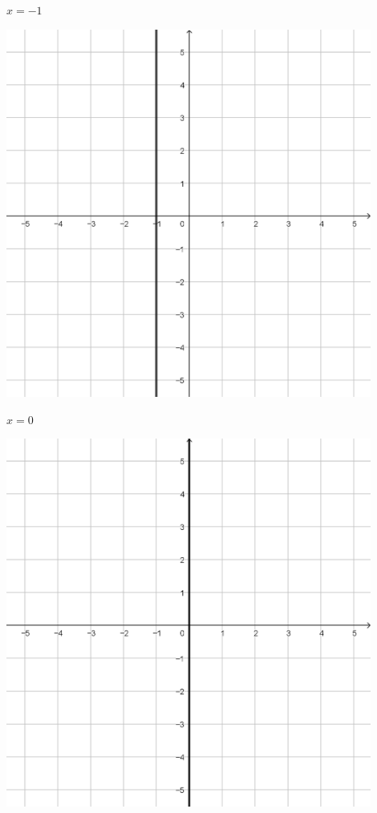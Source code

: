 \documentclass{oblivoir}
\begin{document}
\begin{minipage}{0.45\textwidth}
\begin{minipage}{0.45\textwidth}
\end{minipage}\bigskip\bigskip\par
\begin{minipage}{0.45\textwidth}\centering
\(x=-1\)
\par\bigskip\includegraphics[width=0.9\textwidth]{L11}
\end{minipage}
\begin{minipage}{0.45\textwidth}\centering
\(x=0\)
\par\bigskip\includegraphics[width=0.9\textwidth]{L12}
\end{minipage}\bigskip\bigskip\par
\end{minipage}
\normalsize
\end{document}
